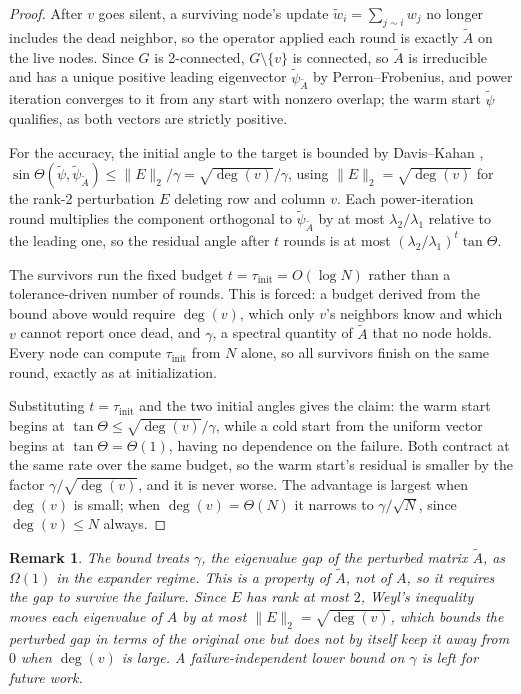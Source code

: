\documentclass[letterpaper]{article} %
\newtheorem{remark}{Remark}
\begin{document}
\begin{proof}
After $v$ goes silent, a surviving node's update
$\tilde w_i = \sum_{j\sim i} w_j$ no longer includes the dead neighbor, so the
operator applied each round is exactly $\tilde A$ on the live nodes. Since $G$ is
2-connected, $G\setminus\{v\}$ is connected, so $\tilde A$ is irreducible and has
a unique positive leading eigenvector $\tilde\psi_{\tilde A}$ by
Perron--Frobenius, and power iteration converges to it from any start with
nonzero overlap; the warm start $\tilde\psi$ qualifies, as both vectors are
strictly positive.

For the accuracy, the initial angle to the target is bounded by Davis--Kahan
\citep{daviskahan1970},
$\sin\Theta(\tilde\psi,\tilde\psi_{\tilde A}) \leq \|E\|_2/\gamma
= \sqrt{\deg(v)}/\gamma$, using $\|E\|_2 = \sqrt{\deg(v)}$ for the rank-2
perturbation $E$ deleting row and column $v$. Each power-iteration round
multiplies the component orthogonal to $\tilde\psi_{\tilde A}$ by at most
$\lambda_2/\lambda_1$ relative to the leading one, so the residual angle after
$t$ rounds is at most $(\lambda_2/\lambda_1)^t\tan\Theta$.

The survivors run the fixed budget $t = \tau_{\mathrm{init}} = O(\log N)$
rather than a tolerance-driven number of rounds. This is forced: a budget
derived from the bound above would require $\deg(v)$, which only $v$'s
neighbors know and which $v$ cannot report once dead, and $\gamma$, a spectral
quantity of $\tilde A$ that no node holds. Every node can compute
$\tau_{\mathrm{init}}$ from $N$ alone, so all survivors finish on the same
round, exactly as at initialization.

Substituting $t = \tau_{\mathrm{init}}$ and the two initial angles gives the
claim: the warm start begins at $\tan\Theta \leq \sqrt{\deg(v)}/\gamma$, while
a cold start from the uniform vector begins at $\tan\Theta = \Theta(1)$, having
no dependence on the failure. Both contract at the same rate over the same
budget, so the warm start's residual is smaller by the factor
$\gamma/\sqrt{\deg(v)}$, and it is never worse. The advantage is largest when
$\deg(v)$ is small; when $\deg(v) = \Theta(N)$ it narrows to
$\gamma/\sqrt{N}$, since $\deg(v) \leq N$ always.
\end{proof}

\begin{remark}
\label{rem:gamma}
The bound treats $\gamma$, the eigenvalue gap of the \emph{perturbed} matrix
$\tilde A$, as $\Omega(1)$ in the expander regime. This is a property of
$\tilde A$, not of $A$, so it requires the gap to survive the failure. Since
$E$ has rank at most $2$, Weyl's inequality moves each eigenvalue of $A$ by at
most $\|E\|_2 = \sqrt{\deg(v)}$, which bounds the perturbed gap in terms of the
original one but does not by itself keep it away from $0$ when $\deg(v)$ is
large. A failure-independent lower bound on $\gamma$ is left for future work.
\end{remark}
\end{document}
